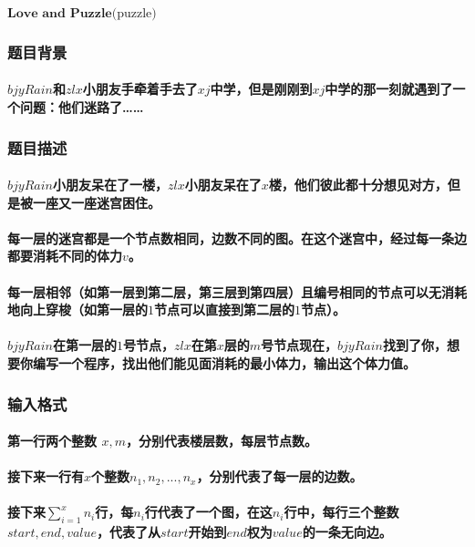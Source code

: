 \documentclass[final,11pt,oneside,UTF8]{report}
\begin{document}
\newpage

\centerline{\LARGE{$\textbf{Love and Puzzle}\text{(puzzle)}$}}
\subsubsection{题目背景}
\paragraph{$bjyRain$和$zlx$小朋友手牵着手去了$xj$中学，但是刚刚到$xj$中学的那一刻就遇到了一个问题：他们迷路了……}
\subsubsection{题目描述}
\paragraph{$bjyRain$小朋友呆在了一楼，$zlx$小朋友呆在了$x$楼，他们彼此都十分想见对方，但是被一座又一座迷宫困住。}
\paragraph{每一层的迷宫都是一个节点数相同，边数不同的图。在这个迷宫中，经过每一条边都要消耗不同的体力$v$。}
\paragraph{每一层相邻（如第一层到第二层，第三层到第四层）且编号相同的节点可以无消耗地向上穿梭（如第一层的$1$节点可以直接到第二层的$1$节点）。}
\paragraph{$bjyRain$在第一层的$1$号节点，$zlx$在第$x$层的$m$号节点现在，$bjyRain$找到了你，想要你编写一个程序，找出他们能见面消耗的最小体力，输出这个体力值。}
\subsubsection{输入格式}
\paragraph{第一行两个整数 $x,m$，分别代表楼层数，每层节点数。}
\paragraph{接下来一行有$x$个整数$n_1, n_2,...,n_x$，分别代表了每一层的边数。}
\paragraph{接下来$\sum_{i = 1}^{x} n_i $行，每$n_i$行代表了一个图，在这$n_i$行中，每行三个整数$start,end,value$，代表了从$start$开始到$end$权为$value$的一条无向边。}
\end{document}

